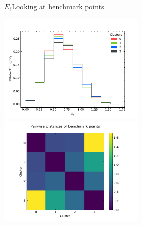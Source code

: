 %
\begin{frame}{$E_\ell$}{Looking at benchmark points}
	\begin{changemargin}{-1cm}{-1cm}
		\begin{center}
			{\includegraphics[height=5.2cm, clip, trim=0cm 0cm 1.2cm 1cm]{figures/from-paper/El_tanbeta_dist3}}
			{\includegraphics[height=5.2cm, clip, trim=2.3cm 0cm 2cm 0cm]{figures/from-paper/El_tanbeta_dist3_bpoint_distances}}
		\end{center}
	\end{changemargin}
\end{frame}
%
%	
